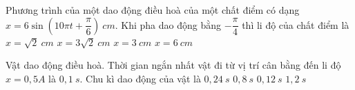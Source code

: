 	\begin{ex}%
		Phương trình của một dao động điều hoà của một chất điểm có dạng \linebreak $x = 6\sin\left(10\pi t + \dfrac{\pi}{6}\right)\ cm$. Khi pha dao động bằng $-\dfrac{\pi}{4}$ thì li độ của chất điểm là
		\choice
		{$x = \sqrt{2}\ cm$}
		{\True $x = 3\sqrt{2}\ cm$}
		{$x = 3\ cm$}
		{$x = 6\ cm$}
	\end{ex}
	\begin{ex} %
		Vật dao động điều hoà. Thời gian ngắn nhất vật đi từ vị trí cân bằng đến li độ $x = 0,5A$ là $0,1\ s$. Chu kì dao động của vật là
		\choice
		{$0,24\ s$}
		{$0,8\ s$}
		{$0,12\ s$}
		{\True $1,2\ s$}
	\end{ex}
